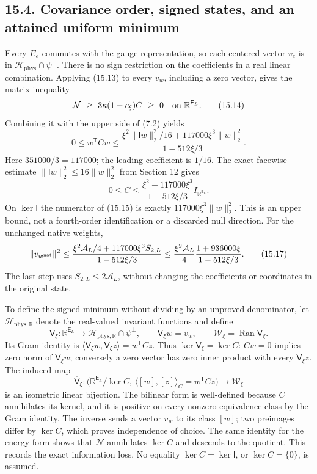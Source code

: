 \documentclass[
]{article}
\begin{document}
\subsection{15.4. Covariance order, signed states, and an attained
uniform
minimum}\label{covariance-order-signed-states-and-an-attained-uniform-minimum}

Every \(E_e\) commutes with the gauge representation, so each centered
vector \(v_e\) is in \(\mathcal H_{\mathrm{phys}}\cap\psi^\perp\). There
is no sign restriction on the coefficients in a real linear combination.
Applying (15.13) to every \(v_w\), including a zero vector, gives the
matrix inequality \[
\mathcal N\ \ge\
3\kappa(1-c_\xi)C\ \ge\ 0
\quad\hbox{on }\mathbb R^{\mathsf E_L}.                       \tag{15.14}
\] Combining it with the upper side of (7.2) yields \[
0\le w^{\mathsf T}Cw
 \le\frac{\xi^2\|\mathsf Iw\|_2^2/16
               +117000\xi^3\|w\|_2^2}{1-512\xi/3}.           \tag{15.15}
\] Here \(351000/3=117000\); the leading coefficient is \(1/16\). The
exact facewise estimate \(\|\mathsf Iw\|_2^2\le16\|w\|_2^2\) from
Section 12 gives \[
0\le C\le
\frac{\xi^2+117000\xi^3}{1-512\xi/3}
 I_{\mathbb R^{\mathsf E_L}}.                                \tag{15.16}
\] On \(\ker\mathsf I\) the numerator of (15.15) is exactly
\(117000\xi^3\|w\|_2^2\). This is an upper bound, not a fourth-order
identification or a discarded null direction. For the unchanged native
weights, \[
\|v_{w^{\rm nat}}\|^2
 \le\frac{\xi^2\mathcal A_L/4+117000\xi^3 S_{2,L}}
              {1-512\xi/3}
 \le\frac{\xi^2\mathcal A_L}{4}
       \frac{1+936000\xi}{1-512\xi/3}.                       \tag{15.17}
\] The last step uses \(S_{2,L}\le2\mathcal A_L\), without changing the
coefficients or coordinates in the original state.

To define the signed minimum without dividing by an unproved
denominator, let \(\mathcal H_{\mathrm{phys},\mathbb R}\) denote the
real-valued invariant functions and define \[
\mathsf V_\xi:\mathbb R^{\mathsf E_L}
 \longrightarrow\mathcal H_{\mathrm{phys},\mathbb R}\cap\psi^\perp,
\qquad
\mathsf V_\xi w=v_w,\qquad
\mathscr W_\xi=\operatorname{Ran}\mathsf V_\xi.               \tag{15.18}
\] Its Gram identity is
\(\langle\mathsf V_\xi w,\mathsf V_\xi z\rangle=w^{\mathsf T}Cz\). Thus
\(\ker\mathsf V_\xi=\ker C\): \(Cw=0\) implies zero norm of
\(\mathsf V_\xi w\); conversely a zero vector has zero inner product
with every \(\mathsf V_\xi z\). The induced map \[
\overline{\mathsf V}_\xi:
\bigl(\mathbb R^{\mathsf E_L}/\ker C,\,
       \langle[w],[z]\rangle_C=w^{\mathsf T}Cz\bigr)
 \longrightarrow\mathscr W_\xi                              \tag{15.19}
\] is an isometric linear bijection. The bilinear form is well-defined
because \(C\) annihilates its kernel, and it is positive on every
nonzero equivalence class by the Gram identity. The inverse sends a
vector \(v_w\) to its class \([w]\); two preimages differ by \(\ker C\),
which proves independence of choice. The same identity for the energy
form shows that \(\mathcal N\) annihilates \(\ker C\) and descends to
the quotient. This records the exact information loss. No equality
\(\ker C=\ker\mathsf I\), or \(\ker C=\{0\}\), is assumed.
\end{document}
